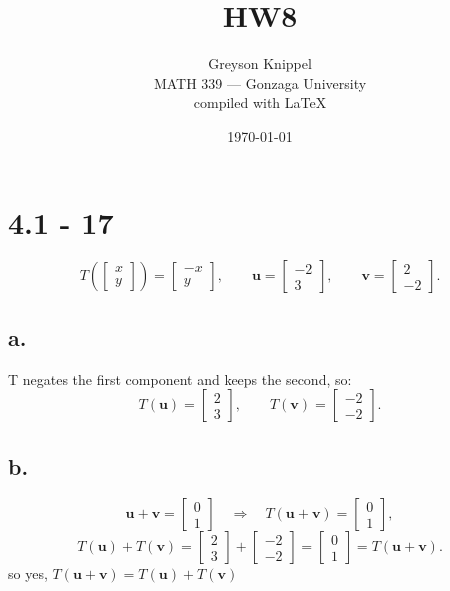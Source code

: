 \documentclass{article}
\title{HW8}
\author{
Greyson Knippel \\[4pt]
MATH 339 --- Gonzaga University \\[4pt]
compiled with \LaTeX{}
}
\date{\today}
\begin{document}
\maketitle

\section*{4.1 - 17}

\[
T\left(\begin{bmatrix} x \\ y \end{bmatrix}\right) = \begin{bmatrix} -x \\ y \end{bmatrix},
\qquad
\mathbf{u} = \begin{bmatrix} -2 \\ 3 \end{bmatrix},
\qquad
\mathbf{v} = \begin{bmatrix} 2 \\ -2 \end{bmatrix}.
\]

\subsection*{a.}

T negates the first component and keeps the second, so:
\[
T(\mathbf{u}) = \begin{bmatrix} 2 \\ 3 \end{bmatrix},
\qquad
T(\mathbf{v}) = \begin{bmatrix} -2 \\ -2 \end{bmatrix}.
\]

\subsection*{b.}

\[
\mathbf{u} + \mathbf{v} = \begin{bmatrix} 0 \\ 1 \end{bmatrix}
\quad \Rightarrow \quad
T(\mathbf{u} + \mathbf{v}) = \begin{bmatrix} 0 \\ 1 \end{bmatrix},
\]
\[
T(\mathbf{u}) + T(\mathbf{v})
= \begin{bmatrix} 2 \\ 3 \end{bmatrix} + \begin{bmatrix} -2 \\ -2 \end{bmatrix}
= \begin{bmatrix} 0 \\ 1 \end{bmatrix}
= T(\mathbf{u} + \mathbf{v}).
\]
so yes, $T(\mathbf{u} + \mathbf{v}) = T(\mathbf{u}) + T(\mathbf{v})$
\end{document}
